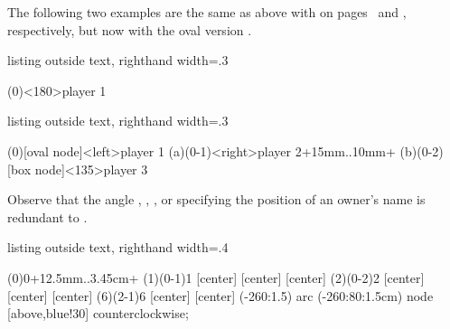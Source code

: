The following two examples are the same as above with \cmd{\istroot} on pages~\pageref{page:onesimpletree} and \pageref{page:threesimpletrees}, respectively, but now with the oval version \cmd{\istrooto}.

\begin{tcblisting}{listing outside text, righthand width=.3\linewidth}
\begin{istgame}[font=\itshape]
\istrooto[right](0)<180>{player 1}
  \istb  \istb  \endist
\end{istgame}
\end{tcblisting}


\begin{tcblisting}{listing outside text, righthand width=.3\linewidth}
\begin{istgame}
\xtdistance{20mm}{20mm}
\istrooto[right](0)[oval node]<left>{player 1}
  \istb  \istb  \endist
\istroot(a)(0-1)<right>{player 2}+15mm..10mm+
  \istb  \istb  \endist
\istrooto[right](b)(0-2)[box node]<135>{player 3}
  \istb  \istb  \endist
\end{istgame}
\end{tcblisting}

Observe that the angle , , , or  specifying the position of an owner's name is redundant to \cmd{\istrooto}.

\begin{tcblisting}{listing outside text, righthand width=.4\linewidth}
\begin{istgame}
\setistOvalNodeStyle{.6cm}
\istrooto(0){0}+{12.5mm}..{3.45cm}+
  \istb  \istb  \endist
{}
\xtdistance{12.5mm}{11.5mm}
\istrooto(1)(0-1){1}
  [center]  [center]
  [center]  \endist
\istrooto(2)(0-2){2}
  [center]  [center]
  [center]  \endist
\istrooto(6)(2-1){6}
  [center]  [center]
  \endist
{}(-260:1.5) 
  arc (-260:80:1.5cm)
  node [above,blue!30] {counterclockwise};
\end{istgame}
\end{tcblisting}


%

